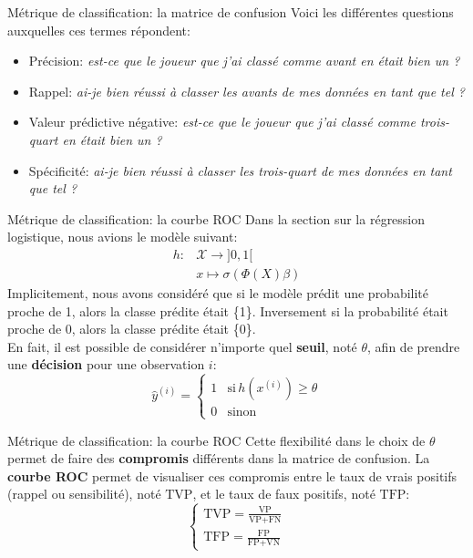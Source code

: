 \documentclass[10pt]{beamer}  %
\begin{document}
\begin{frame}{Métrique de classification: la matrice de confusion}
	Voici les différentes questions auxquelles ces termes répondent:
	\begin{itemize}
		\item Précision: \textit{est-ce que le joueur que j'ai classé comme avant en était bien un ?}
		\item Rappel: \textit{ai-je bien réussi à classer les avants de mes données en tant que tel ?}
		\item Valeur prédictive négative: \textit{est-ce que le joueur que j'ai classé comme trois-quart en était bien un ?}
		\item Spécificité: \textit{ai-je bien réussi à classer les trois-quart de mes données en tant que tel ?}
	\end{itemize}
\end{frame}

\begin{frame}{Métrique de classification: la courbe ROC}
	Dans la section sur la régression logistique, nous avions le modèle suivant:
	\begin{equation}
		\begin{aligned}
			h: &\mathcal{X} \to ]0, 1[ \\
			   &x \mapsto \sigma\left(\Phi(X) \beta\right)
		\end{aligned}
		\nonumber
	\end{equation}
	\pause
	Implicitement, nous avons considéré que si le modèle prédit une probabilité proche de 1, alors la classe prédite était \{1\}. Inversement si la probabilité était proche de 0, alors la classe prédite était \{0\}. \\
	\pause
	\vspace{0.3cm}
	En fait, il est possible de considérer n'importe quel \textbf{seuil}, noté $\theta$, afin de prendre une \textbf{décision} pour une observation $i$:
	\begin{equation}
		\hat{y}^{(i)} = 
		\begin{cases}
			1 & \text{si} \, h(x^{(i)}) \ge \theta \\
			0 & \text{sinon}
		\end{cases}
		\nonumber
	\end{equation}
\end{frame}

\begin{frame}{Métrique de classification: la courbe ROC}
	Cette flexibilité dans le choix de $\theta$ permet de faire des \textbf{compromis} différents dans la matrice de confusion. La \textbf{courbe ROC} permet de visualiser ces compromis entre le taux de vrais positifs (rappel ou sensibilité), noté $\text{TVP}$, et le taux de faux positifs, noté $\text{TFP}$:
	\begin{equation}
		\begin{cases}
			\text{TVP} = \displaystyle \frac{\text{VP}}{\text{VP} + \text{FN}} \\[10pt]
			\text{TFP} = \displaystyle \frac{\text{FP}}{\text{FP} + \text{VN}}
		\end{cases}
		\nonumber
	\end{equation}	
\end{frame}
\end{document}

